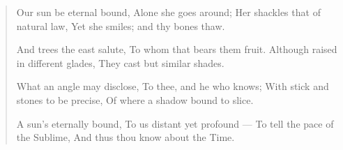 \begingroup
	\fontsize{10pt}{12pt}\selectfont
		\begin{quote}
			Our sun be eternal bound,
			Alone she goes around;
			Her shackles that of natural law,%
			Yet she smiles; and thy bones thaw.

			And trees the east salute,
			To whom that bears them fruit.
			Although raised in different glades,
			They cast but similar shades.

			What an angle may disclose,
			To thee, and he who knows; %
			With stick and stones to be precise,
			Of where a shadow bound to slice.

			A sun's eternally bound,
			To us distant yet profound —
			To tell the pace of the Sublime,
			And thus thou know about the Time.
		\end{quote} 
\endgroup





